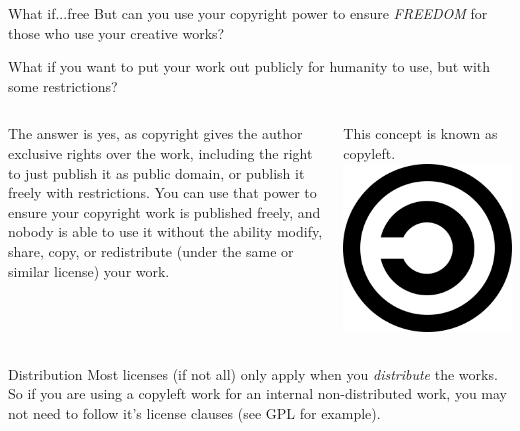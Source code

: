 \begin{frame}{What if...free}
  But can you use your copyright power to ensure \textit{FREEDOM} for those who use your creative works?\pause

  What if you want to put your work out publicly for humanity to use, but with some restrictions? \pause
\begin{columns}[onlytextwidth,T]
  The answer is yes, as copyright gives the author exclusive rights over the work, including the right to just publish it as public domain, or publish it freely with restrictions. You can use that power to ensure your copyright work is published freely, and nobody is able to use it without the ability modify, share, copy, or redistribute (under the same or similar license) your work.

  This concept is known as copyleft.
  \center \includegraphics[width=\textwidth]{eimg/CopyleftSym.png}
  \end{columns}
\end{frame}

\begin{frame}{Distribution}
  Most licenses (if not all) only apply when you \textit{distribute} the works. So if you are using a copyleft work for an internal non-distributed work, you may not need to follow it's license clauses (see GPL for example).
\end{frame}


